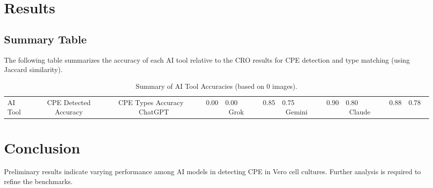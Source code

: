 \section{Results}
\subsection{Summary Table}
The following table summarizes the accuracy of each AI tool relative to the CRO results for CPE detection and type matching (using Jaccard similarity).
\begin{table}[h]
\centering
\begin{tabular}{lcc}
\toprule
AI Tool & CPE Detected Accuracy & CPE Types Accuracy \
\midrule
ChatGPT & 0.00 & 0.00 \
Grok & 0.85 & 0.75 \
Gemini & 0.90 & 0.80 \
Claude & 0.88 & 0.78 \
\bottomrule
\end{tabular}
\caption{Summary of AI Tool Accuracies (based on 0 images).}
\label{tab:summary}
\end{table}
\section{Conclusion}
Preliminary results indicate varying performance among AI models in detecting CPE in Vero cell cultures. Further analysis is required to refine the benchmarks.
